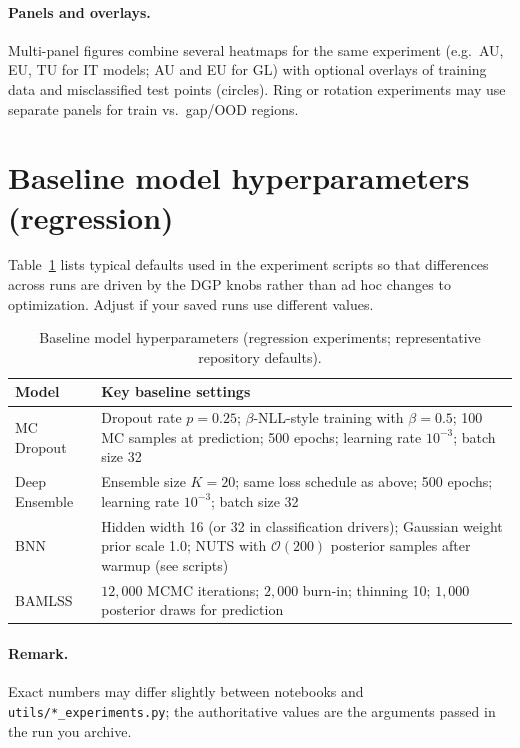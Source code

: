 \paragraph{Panels and overlays.}
Multi-panel figures combine several heatmaps for the same experiment (e.g.\ AU, EU, TU for IT models; AU and EU for GL) with optional overlays of training data and misclassified test points (circles). Ring or rotation experiments may use separate panels for train vs.\ gap/OOD regions.

\section{Baseline model hyperparameters (regression)}
\label{sec:baseline-model-params}

Table~\ref{tab:baseline-model-params} lists typical defaults used in the experiment scripts so that differences across runs are driven by the DGP knobs rather than ad hoc changes to optimization. Adjust if your saved runs use different values.

\begin{table}[htbp]
  \centering
  \caption{Baseline model hyperparameters (regression experiments; representative repository defaults).}
  \label{tab:baseline-model-params}
  \begin{tabular}{lp{9.5cm}}
    \toprule
    Model & Key baseline settings \\
    \midrule
    MC Dropout & Dropout rate $p=0.25$; $\beta$-NLL-style training with $\beta=0.5$; 100 MC samples at prediction; 500 epochs; learning rate $10^{-3}$; batch size 32 \\
    Deep Ensemble & Ensemble size $K=20$; same loss schedule as above; 500 epochs; learning rate $10^{-3}$; batch size 32 \\
    BNN & Hidden width 16 (or 32 in classification drivers); Gaussian weight prior scale 1.0; NUTS with $\mathcal{O}(200)$ posterior samples after warmup (see scripts) \\
    BAMLSS & $12{,}000$ MCMC iterations; $2{,}000$ burn-in; thinning 10; $1{,}000$ posterior draws for prediction \\
    \bottomrule
  \end{tabular}
\end{table}

\paragraph{Remark.}
Exact numbers may differ slightly between notebooks and \texttt{utils/*\_experiments.py}; the authoritative values are the arguments passed in the run you archive.

